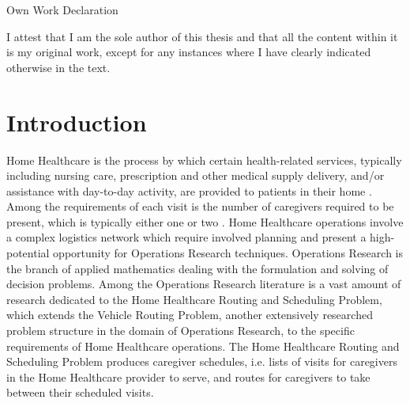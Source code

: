 \documentclass[11pt,twoside]{article}
\numberwithin{Theorem}{section}
\numberwithin{Definition}{section}
\numberwithin{Lemma}{section}
\numberwithin{Algorithm}{section}
\numberwithin{equation}{section}
\begin{document}
\clearpage

\begin{center}
\Large{Own Work Declaration}
\end{center}

I attest that I am the sole author of this thesis and that all the content within it is my original work, except for any instances where I have clearly indicated otherwise in the text. 

\cleardoublepage




\tableofcontents
\clearpage
\listoftables
\listoffigures
\cleardoublepage

\setcounter{page}{1}

\nocite{*}

\clearpage

\section{Introduction}
\label{sec.intro}
Home Healthcare is the process by which certain health-related services, typically including nursing care, prescription and other medical supply delivery, and/or assistance with day-to-day activity, are provided to patients in their home \cite{al-hamad}. Among the requirements of each visit is the number of caregivers required to be present, which is typically either one or two \cite{Mankowska2014}. Home Healthcare operations involve a complex logistics network which require involved planning and present a high-potential opportunity for Operations Research techniques. Operations Research is the branch of applied mathematics dealing with the formulation and solving of decision problems. Among the Operations Research literature is a vast amount of research dedicated to the Home Healthcare Routing and Scheduling Problem, which extends the Vehicle Routing Problem, another extensively researched problem structure in the domain of Operations Research, to the specific requirements of Home Healthcare operations. The Home Healthcare Routing and Scheduling Problem produces caregiver schedules, i.e. lists of visits for caregivers in the Home Healthcare provider to serve, and routes for caregivers to take between their scheduled visits. 
\end{document}
